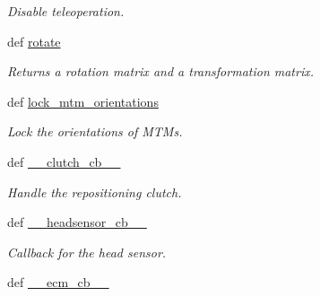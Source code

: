 \begin{DoxyCompactItemize}
\begin{DoxyCompactList}\small\item\em Disable teleoperation. \end{DoxyCompactList}\item 
def \hyperlink{classcamera__control__node_1_1Teleop__class_aa78815b8b1658cbcfb27884dbc7a18c9}{rotate}
\begin{DoxyCompactList}\small\item\em Returns a rotation matrix and a transformation matrix. \end{DoxyCompactList}\item 
\hypertarget{classcamera__control__node_1_1Teleop__class_a6ce4ac6cf0fa31b92c3bbb2243f872ea}{def \hyperlink{classcamera__control__node_1_1Teleop__class_a6ce4ac6cf0fa31b92c3bbb2243f872ea}{lock\-\_\-mtm\-\_\-orientations}}\label{classcamera__control__node_1_1Teleop__class_a6ce4ac6cf0fa31b92c3bbb2243f872ea}

\begin{DoxyCompactList}\small\item\em Lock the orientations of M\-T\-Ms. \end{DoxyCompactList}\item 
\hypertarget{classcamera__control__node_1_1Teleop__class_a319d4bc069613f66678c92a0f84335a7}{def \hyperlink{classcamera__control__node_1_1Teleop__class_a319d4bc069613f66678c92a0f84335a7}{\-\_\-\-\_\-clutch\-\_\-cb\-\_\-\-\_\-}}\label{classcamera__control__node_1_1Teleop__class_a319d4bc069613f66678c92a0f84335a7}

\begin{DoxyCompactList}\small\item\em Handle the repositioning clutch. \end{DoxyCompactList}\item 
\hypertarget{classcamera__control__node_1_1Teleop__class_a001d48af70c89abcc97d8f17de43effe}{def \hyperlink{classcamera__control__node_1_1Teleop__class_a001d48af70c89abcc97d8f17de43effe}{\-\_\-\-\_\-headsensor\-\_\-cb\-\_\-\-\_\-}}\label{classcamera__control__node_1_1Teleop__class_a001d48af70c89abcc97d8f17de43effe}

\begin{DoxyCompactList}\small\item\em Callback for the head sensor. \end{DoxyCompactList}\item 
\hypertarget{classcamera__control__node_1_1Teleop__class_ae13fa9f52fcfa6635b9df706ac8056e4}{def \hyperlink{classcamera__control__node_1_1Teleop__class_ae13fa9f52fcfa6635b9df706ac8056e4}{\-\_\-\-\_\-ecm\-\_\-cb\-\_\-\-\_\-}}\label{classcamera__control__node_1_1Teleop__class_ae13fa9f52fcfa6635b9df706ac8056e4}


\end{DoxyCompactItemize}
